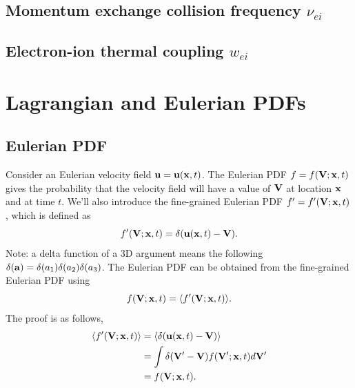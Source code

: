 \documentclass[a4paper,11pt]{report}
\begin{document}
\section{Momentum exchange collision frequency $\nu_{ei}$}

\section{Electron-ion thermal coupling $w_{ei}$}

%
%
\appendix
%
%

\chapter{Lagrangian and Eulerian PDFs}
\section{Eulerian PDF}
Consider an Eulerian velocity field $\mathbf{u} = \mathbf{u}(\mathbf{x},t)$. The Eulerian PDF $f = f(\mathbf{V}; \mathbf{x},t)$ gives the probability that the velocity field will have a value of $\mathbf{V}$ at location $\mathbf{x}$ and at time $t$. We'll also introduce the fine-grained Eulerian PDF $f' = f'(\mathbf{V};\mathbf{x},t)$, which is defined as 
\begin{equation}
    f'(\mathbf{V}; \mathbf{x}, t) = \delta(\mathbf{u}(\mathbf{x},t) - \mathbf{V}).
\end{equation}
Note: a delta function of a 3D argument means the following $\delta(\mathbf{a}) = \delta(a_1) \delta(a_2) \delta(a_3) $. The Eulerian PDF can be obtained from the fine-grained Eulerian PDF using 
\begin{equation}
    \label{eq:fine_eul_pdf}
    f(\mathbf{V}; \mathbf{x}, t)=\langle f'(\mathbf{V}; \mathbf{x}, t) \rangle.
\end{equation}
The proof is as follows,
\begin{align}
    \langle f'(\mathbf{V}; \mathbf{x}, t) \rangle &= \langle \delta( \mathbf{u}(\mathbf{x},t) - \mathbf{V}) \rangle \nonumber \\
    &= \int \delta( \mathbf{V}' - \mathbf{V}) f(\mathbf{V}';\mathbf{x},t) d\mathbf{V}' \nonumber \\
    &= f(\mathbf{V}; \mathbf{x}, t).
\end{align}
\end{document}
